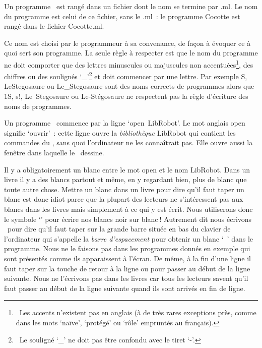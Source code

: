 Un programme \ocaml\ est rangé dans un fichier dont le nom se termine par {\idt .ml}.
Le nom du programme est celui de ce fichier, sans le {\idt .ml}~: le programme 
{\idt Cocotte} est rangé dans le fichier {\idt Cocotte.ml}.

Ce nom est choisi par le programmeur
à sa convenance, de façon à évoquer ce à quoi sert son programme.
 La seule règle à res\-pec\-ter est que le nom du programme
ne doit comporter que des lettres minuscules ou
majuscules non accentuées\footnote{\ Les accents n'existent pas en anglais
(à de très rares exceptions près, comme dans les mots `naïve', `protégé' ou
`rôle' empruntés au français).}, des chiffres ou
des soulignés `\_'\footnote{\ Le souligné `\_' ne doit pas être confondu avec le tiret `-'.}
et doit commencer par une lettre. Par exemple {\idt  S}, 
{\idt  LeStegosaure} ou {\idt  Le\_Stegosaure} sont des noms corrects de
programmes alors que {\idt  1S}, 
{\idt  s!}, {\idt  Le\ Stegosaure} ou {\idt  Le-Stégosaure} ne respectent
pas la règle d'écriture des noms de programmes. 

Un programme \ocaml\ commence par la ligne `{\mcl open}\ {\idt LibRobot}'.
Le mot anglais {\mcl open} signifie `ouvrir'~: cette ligne ouvre la 
{\em bibliothèque} {\idt LibRobot} qui contient les commandes du 
\robot, sans quoi l'ordinateur ne les connaîtrait pas. Elle ouvre aussi la fenêtre 
dans laquelle le \robot\ dessine.

Il y a obligatoirement un blanc
entre le mot {\mcl open} et le nom {\idt LibRobot}. Dans un livre il y a des blancs partout et même, en y regardant bien,
plus de blanc que toute autre chose. Mettre un blanc dans un livre pour dire qu'il faut taper
un blanc est donc idiot parce que la plupart des lecteurs ne s'intéressent pas aux 
blancs dans les livres mais simplement à ce qui y est écrit.
Nous utiliserons donc le symbole `\blanc' pour écrire nos blancs noir sur \hbox{blanc$\:$!}
Autrement dit nous écrivons \blanc\ pour dire qu'il faut taper sur la grande barre 
située en bas du clavier de l'or\-di\-na\-teur qui s'appelle la 
{\em barre d'espacement}
pour obtenir un blanc `\ ' dans le programme. 
Nous ne le faisons pas dans les programmes donnés en exemple qui sont
présentés comme ils apparaissent à l'écran. De même, à la fin d'une 
ligne il faut taper sur la touche de retour à la ligne 
\framebox[11.mm][l]{$\hookleftarrow$~~~}\hspace{0.3ex} ou \hspace{0.3ex}\hspace{0.3ex} pour passer au début de la
ligne suivante. Nous ne l'écrivons pas dans les livres car tous les lecteurs savent
qu'il faut passer au début de la ligne suivante quand ils sont arrivés en fin de ligne. 

